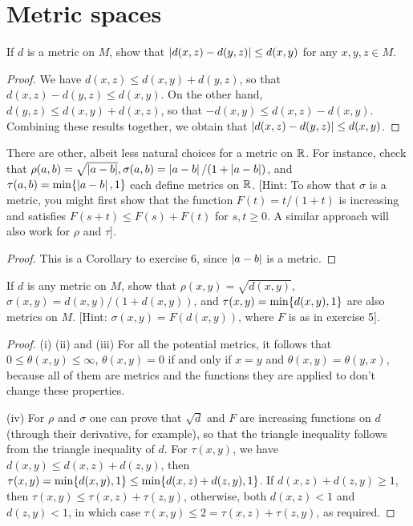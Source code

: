 \section{Metric spaces}


\begin{exercise}{2}
If $d$ is a metric on $M$, show that $\left\lvert d(x,z)-d(y,z)\right\rvert\leq d(x,y)$ for any $x,y,z\in M$.
\end{exercise}
\begin{proof}
We have $d(x,z)\leq d(x,y)+d(y,z)$, so that $d(x,z)-d(y,z)\leq d(x,y)$. On the other hand, $d(y,z)\leq d(x,y)+d(x,z)$, so that $-d(x,y)\leq d(x,z)-d(x,y)$. Combining these results together, we obtain that $\left\lvert d(x,z)-d(y,z)\right\rvert\leq d(x,y)$.
\end{proof} 

\begin{exercise}{5}
There are other, albeit less natural choices for a metric on $\mathbb{R}$. For instance, check that $\rho(a,b)=\sqrt{\left\lvert a-b\right\rvert},\sigma(a,b)=\left\lvert a-b\right\rvert/(1+\left\lvert a-b\right\rvert)$, and $\tau(a,b)=\min\{\left\lvert a-b\right\rvert,1\}$ each define metrics on $\mathbb{R}$. [Hint: To show that $\sigma$ is a metric, you might first show that the function $F(t)=t/(1+t)$ is increasing and satisfies $F(s+t)\leq F(s)+F(t)$ for $s,t\geq 0$. A similar approach will also work for $\rho$ and $\tau$].
\end{exercise}
\begin{proof}
This is a Corollary to exercise 6, since $\left\lvert a-b\right\rvert$ is a metric.
\end{proof} 

\begin{exercise}{6}
If $d$ is any metric on $M$, show that $\rho(x,y)=\sqrt{d(x,y)}$, $\sigma(x,y)=d(x,y)/(1+d(x,y))$, and $\tau(x,y)=\min\{d(x,y),1\}$ are also metrics on $M$. [Hint: $\sigma(x,y)=F(d(x,y))$, where $F$ is as in exercise 5].
\end{exercise}
\begin{proof}
(i) (ii) and (iii) For all the potential metrics, it follows that $0\leq \theta(x,y)\leq\infty$, $\theta(x,y)=0$ if and only if $x=y$ and $\theta(x,y)=\theta(y,x)$, because all of them are metrics and the functions they are applied to don't change these properties.

(iv) For $\rho$ and $\sigma$ one can prove that $\sqrt{d}$ and $F$ are increasing functions on $d$ (through their derivative, for example), so that the triangle inequality follows from the triangle inequality of $d$. For $\tau(x,y)$, we have $d(x,y)\leq d(x,z)+d(z,y)$, then $\tau(x,y) =\min\{d(x,y),1\}\leq \min\{d(x,z)+d(z,y),1\}$. If $d(x,z)+d(z,y)\geq 1$, then $\tau(x,y)\leq \tau(x,z)+\tau(z,y)$, otherwise, both $d(x,z)<1$ and $d(z,y)<1$, in which case $\tau(x,y)\leq 2=\tau(x,z)+\tau(z,y)$, as required.
\end{proof} 

